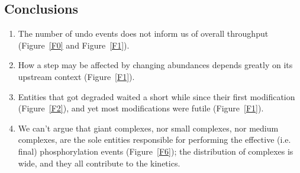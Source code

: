 \subsection{Conclusions}

\begin{enumerate}
\item The number of undo events does not inform us of overall
  throughput (Figure~\ref{F0} and Figure~\ref{F1}).
\item How a step may be affected by changing abundances depends
  greatly on its upstream context (Figure~\ref{F1}).
\item Entities that got degraded waited a short while since their
  first modification (Figure~\ref{F2}), and yet most modifications
  were futile (Figure~\ref{F1}).
\item We can’t argue that giant complexes, nor small complexes, nor
  medium complexes, are the sole entities responsible for performing
  the effective (i.e. final) phosphorylation events  (Figure~\ref{F6}); %
  the distribution of complexes is wide, and they all contribute to
  the kinetics.
\end{enumerate}